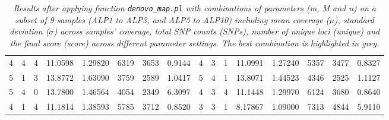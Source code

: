 \documentclass[a4paper, 12pt]{report}
\begin{document}
\begin{table}[h!]
{\begin{tabular}{cccccccc|cccccccc}
		4 & 4 & 4 & 11.0598 & 1.29820 & 6319 & 3653 & 0.9144 & 4 & 3 & 1 & 11.0991 & 1.27240 & 5357 & 3477 & 0.8327 \\
		5 & 1 & 3 & 13.8772 & 1.63090 & 3759 & 2589 & 1.0417 & 5 & 4 & 1 & 13.8071 & 1.44523 & 4346 & 2525 & 1.1127 \\
		5 & 4 & 0 & 13.7800 & 1.46564 & 4054 & 2349 & 6.3097 & 4 & 3 & 4 & 11.1448 & 1.29970 & 6124 & 3680 & 0.8640 \\
		4 & 1 & 4 & 11.1814 & 1.38593 & 5785 & 3712 & 0.8520 & 3 & 3 & 1 & 8.17867 & 1.09000 & 7313 & 4844 & 5.9110 \\
		\bottomrule
	\end{tabular}
	}
	\caption*{\footnotesize{\textit{Results after applying function \texttt{denovo\_map.pl} with combinations of parameters (m, M and n) on a subset of 9 samples (ALP1 to ALP3, and ALP5 to ALP10) including mean coverage ($\mu$), standard deviation ($\sigma$) across samples' coverage, total SNP counts (SNPs), number of unique loci (unique) and the final score (score) across different parameter settings. The best combination is highlighted in grey.}}}
\end{table}



\newpage
\end{document}
